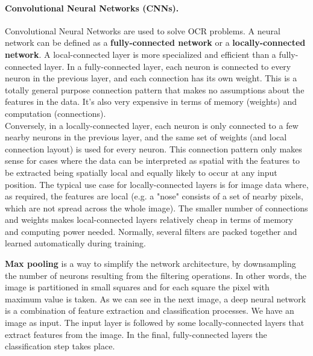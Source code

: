 \paragraph*{Convolutional Neural Networks (CNNs).} Convolutional Neural Networks are used to solve OCR problems. A neural network can be defined as a \textbf{fully-connected network} or a \textbf{locally-connected network}. A local-connected layer is more specialized and efficient than a fully-connected layer. In a fully-connected layer, each neuron is connected to every neuron in the previous layer, and each connection has its own weight. This is a totally general purpose connection pattern that makes no assumptions about the features in the data. It's also very expensive in terms of memory (weights) and computation (connections).\\
Conversely, in a locally-connected layer, each neuron is only connected to a few nearby neurons in the previous layer, and the same set of weights (and local connection layout) is used for every neuron. This connection pattern only makes sense for cases where the data can be interpreted as spatial with the features to be extracted being spatially local and equally likely to occur at any input position. The typical use case for locally-connected layers is for image data where, as required, the features are local (e.g. a "nose" consists of a set of nearby pixels, which are not spread across the whole image). The smaller number of connections and weights makes local-connected layers relatively cheap in terms of memory and computing power needed.
Normally, several filters are packed together and learned automatically during training.

\textbf{Max pooling} is a way to simplify the network architecture, by downsampling the number of neurons resulting from the filtering operations. In other words, the image is partitioned in small squares and for each square the pixel with maximum value is taken.
As we can see in the next image, a deep neural network is a combination of feature extraction and classification processes. We have an image as input. The input layer is followed by some locally-connected layers that extract features from the image. In the final, fully-connected layers the classification step takes place.

